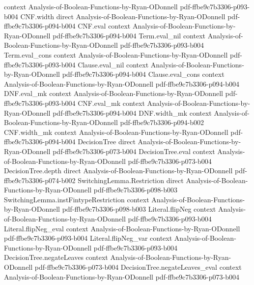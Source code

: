 \begin{theorem}
  {context}
  {Analysis-of-Boolean-Functions-by-Ryan-ODonnell}
  {pdf-ffbe9c7b3306-p093-b004}
\proofstep
  {CNF.width}
  {direct}
  {Analysis-of-Boolean-Functions-by-Ryan-ODonnell}
  {pdf-ffbe9c7b3306-p094-b004}
\proofstep
  {CNF.eval}
  {context}
  {Analysis-of-Boolean-Functions-by-Ryan-ODonnell}
  {pdf-ffbe9c7b3306-p094-b004}
\proofstep
  {Term.eval_nil}
  {context}
  {Analysis-of-Boolean-Functions-by-Ryan-ODonnell}
  {pdf-ffbe9c7b3306-p093-b004}
\proofstep
  {Term.eval_cons}
  {context}
  {Analysis-of-Boolean-Functions-by-Ryan-ODonnell}
  {pdf-ffbe9c7b3306-p093-b004}
\proofstep
  {Clause.eval_nil}
  {context}
  {Analysis-of-Boolean-Functions-by-Ryan-ODonnell}
  {pdf-ffbe9c7b3306-p094-b004}
\proofstep
  {Clause.eval_cons}
  {context}
  {Analysis-of-Boolean-Functions-by-Ryan-ODonnell}
  {pdf-ffbe9c7b3306-p094-b004}
\proofstep
  {DNF.eval_mk}
  {context}
  {Analysis-of-Boolean-Functions-by-Ryan-ODonnell}
  {pdf-ffbe9c7b3306-p093-b004}
\proofstep
  {CNF.eval_mk}
  {context}
  {Analysis-of-Boolean-Functions-by-Ryan-ODonnell}
  {pdf-ffbe9c7b3306-p094-b004}
\proofstep
  {DNF.width_mk}
  {context}
  {Analysis-of-Boolean-Functions-by-Ryan-ODonnell}
  {pdf-ffbe9c7b3306-p094-b002}
\proofstep
  {CNF.width_mk}
  {context}
  {Analysis-of-Boolean-Functions-by-Ryan-ODonnell}
  {pdf-ffbe9c7b3306-p094-b004}
\proofstep
  {DecisionTree}
  {direct}
  {Analysis-of-Boolean-Functions-by-Ryan-ODonnell}
  {pdf-ffbe9c7b3306-p073-b004}
\proofstep
  {DecisionTree.eval}
  {context}
  {Analysis-of-Boolean-Functions-by-Ryan-ODonnell}
  {pdf-ffbe9c7b3306-p073-b004}
\proofstep
  {DecisionTree.depth}
  {direct}
  {Analysis-of-Boolean-Functions-by-Ryan-ODonnell}
  {pdf-ffbe9c7b3306-p074-b002}
\proofstep
  {SwitchingLemma.Restriction}
  {direct}
  {Analysis-of-Boolean-Functions-by-Ryan-ODonnell}
  {pdf-ffbe9c7b3306-p098-b003}
\proofstep
  {SwitchingLemma.instFintypeRestriction}
  {context}
  {Analysis-of-Boolean-Functions-by-Ryan-ODonnell}
  {pdf-ffbe9c7b3306-p098-b003}
\proofstep
  {Literal.flipNeg}
  {context}
  {Analysis-of-Boolean-Functions-by-Ryan-ODonnell}
  {pdf-ffbe9c7b3306-p093-b004}
\proofstep
  {Literal.flipNeg_eval}
  {context}
  {Analysis-of-Boolean-Functions-by-Ryan-ODonnell}
  {pdf-ffbe9c7b3306-p093-b004}
\proofstep
  {Literal.flipNeg_var}
  {context}
  {Analysis-of-Boolean-Functions-by-Ryan-ODonnell}
  {pdf-ffbe9c7b3306-p093-b004}
\proofstep
  {DecisionTree.negateLeaves}
  {context}
  {Analysis-of-Boolean-Functions-by-Ryan-ODonnell}
  {pdf-ffbe9c7b3306-p073-b004}
\proofstep
  {DecisionTree.negateLeaves_eval}
  {context}
  {Analysis-of-Boolean-Functions-by-Ryan-ODonnell}
  {pdf-ffbe9c7b3306-p073-b004}

\end{theorem}
